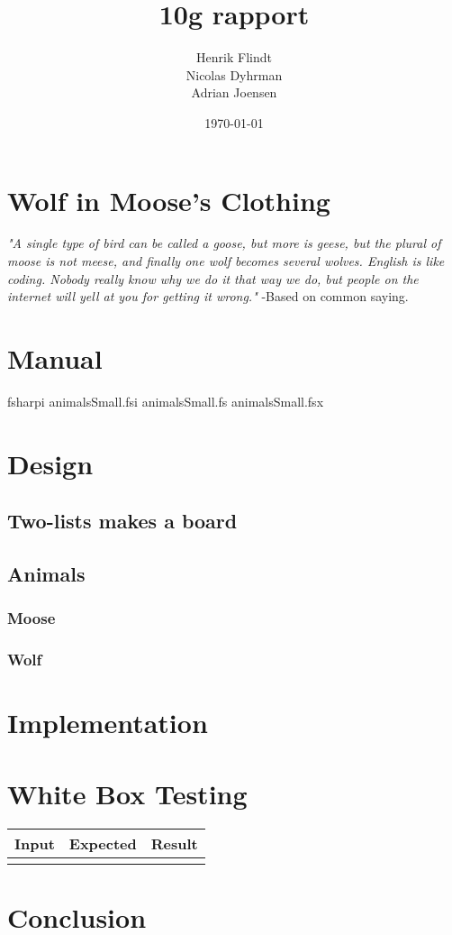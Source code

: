 \documentclass{article}
\title{10g rapport}
\author{Henrik Flindt\\Nicolas Dyhrman\\Adrian Joensen}
\date{\today}
\begin{document}
    \maketitle
    
    \section*{Wolf in Moose's Clothing}
    \textit{"A single type of bird can be called a goose, but more is geese, but the plural of moose is not meese, and finally one wolf becomes several wolves. English is like coding. Nobody really know why we do it that way we do, but people on the internet will yell at you for getting it wrong."} \newline -Based on common saying.
    \section{Manual}
   		fsharpi animalsSmall.fsi animalsSmall.fs animalsSmall.fsx
    
    \section{Design}
    \subsection{Two-lists makes a board}
    \subsection{Animals}
    \subsubsection{Moose}
    \subsubsection{Wolf}    

    \section{Implementation}
       
         
    \section{White Box Testing}
   	   \begin{tabular}{|c|c|c|}
   	   		\hline
   	   		Input & Expected & Result\\
   	   		\hline
   	   		&&\\
   	   		\hline
   	   \end{tabular}
    \section{Conclusion}
     
\end{document}
